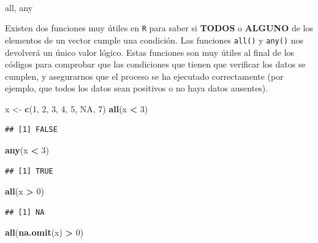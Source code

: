 \documentclass[11pt,]{book}
\newenvironment{Shaded}{\begin{snugshade}}{\end{snugshade}}
\newcommand{\DecValTok}[1]{\textcolor[rgb]{0.06,0.06,0.06}{#1}}
\newcommand{\KeywordTok}[1]{\textcolor[rgb]{0.27,0.27,0.27}{\textbf{#1}}}
\newcommand{\NormalTok}[1]{#1}
\newcommand{\OperatorTok}[1]{\textcolor[rgb]{0.43,0.43,0.43}{\textbf{#1}}}
\newcommand{\OtherTok}[1]{\textcolor[rgb]{0.37,0.37,0.37}{#1}}
\newcommand{\StringTok}[1]{\textcolor[rgb]{0.5,0.5,0.5}{#1}}
\begin{document}
~

all, any

Existen dos funciones muy útiles en \texttt{R} para saber si \textbf{TODOS} o \textbf{ALGUNO} de los elementos de un vector cumple una condición. Las funciones \texttt{all()} y \texttt{any()} nos devolverá un único valor lógico. Estas funciones son muy útiles al final de los códigos para comprobar que las condiciones que tienen que verificar los datos se cumplen, y asegurarnos que el proceso se ha ejecutado correctamente (por ejemplo, que todos los datos sean positivos o no haya datos ausentes).

\begin{Shaded}
\begin{Highlighting}[]
\NormalTok{x <-}\StringTok{ }\KeywordTok{c}\NormalTok{(}\DecValTok{1}\NormalTok{, }\DecValTok{2}\NormalTok{, }\DecValTok{3}\NormalTok{, }\DecValTok{4}\NormalTok{, }\DecValTok{5}\NormalTok{, }\OtherTok{NA}\NormalTok{, }\DecValTok{7}\NormalTok{)}
\KeywordTok{all}\NormalTok{(x }\OperatorTok{<}\StringTok{ }\DecValTok{3}\NormalTok{)}
\end{Highlighting}
\end{Shaded}

\begin{verbatim}
## [1] FALSE
\end{verbatim}

\begin{Shaded}
\begin{Highlighting}[]
\KeywordTok{any}\NormalTok{(x }\OperatorTok{<}\StringTok{ }\DecValTok{3}\NormalTok{)}
\end{Highlighting}
\end{Shaded}

\begin{verbatim}
## [1] TRUE
\end{verbatim}

\begin{Shaded}
\begin{Highlighting}[]
\KeywordTok{all}\NormalTok{(x }\OperatorTok{>}\StringTok{ }\DecValTok{0}\NormalTok{)}
\end{Highlighting}
\end{Shaded}

\begin{verbatim}
## [1] NA
\end{verbatim}

\begin{Shaded}
\begin{Highlighting}[]
\KeywordTok{all}\NormalTok{(}\KeywordTok{na.omit}\NormalTok{(x) }\OperatorTok{>}\StringTok{ }\DecValTok{0}\NormalTok{)}
\end{Highlighting}
\end{Shaded}
\end{document}

